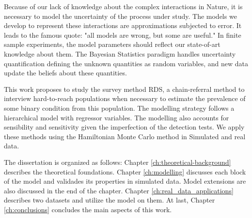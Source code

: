 Because of our lack of knowledge about the complex interactions in Nature, it
is necessary to model the uncertainty of the process under study. The models
we develop to represent these interactions are approximations subjected to
error. It leads to the famous quote: "all models are wrong, but some are
useful." In finite sample experiments, the model parameters should reflect our
state-of-art knowledge about them. The Bayesian Statistics paradigm handles
uncertainty quantification defining the unknown quantities as random
variables, and new data update the beliefs about these quantities.  

This work proposes to study the survey method RDS, a chain-referral method to
interview hard-to-reach populations when necessary to estimate the prevalence
of some binary condition from this population. The modelling strategy follows
a hierarchical model with regressor variables. The modelling also accounts for
sensibility and sensitivity given the imperfection of the detection tests. We
apply these methods using the Hamiltonian Monte Carlo method in Simulated and
real data.

The dissertation is organized as follows: Chapter \ref{ch:theoretical-background}
describes the theoretical foundations. Chapter \ref{ch:modelling} discusses
each block of the model and validades its properties in simulated data. Model
extensions are also discussed in the end of the chapter.
Chapter \ref{ch:real_data_applications} describes two datasets and utilize the
model on them. At last, Chapter \ref{ch:conclusions} concludes the main aspects of
this work.  